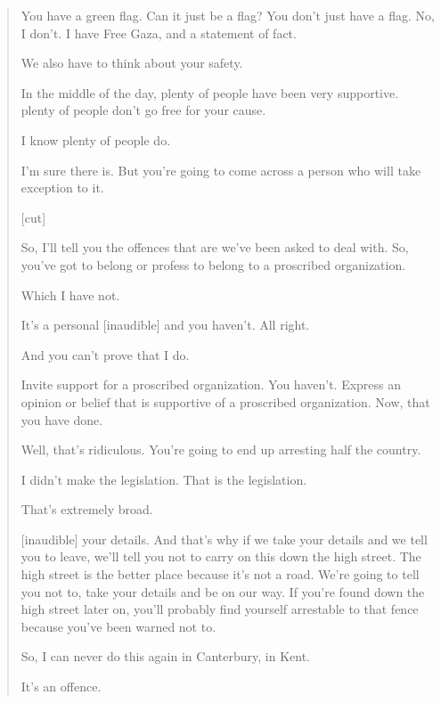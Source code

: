 \begin{quote}
    You have a green flag. Can it just be a flag? You don't just have a flag. No, I don't. I have Free Gaza, and a statement of fact.
    
    We also have to think about your safety.
    
    In the middle of the day, plenty of people have been very supportive. plenty of people don't go free for your cause.
    
    I know plenty of people do.
    
    I'm sure there is. But you’re going to come across a person who will take exception to it.
    
    [cut]
    
    So, I'll tell you the offences that are we've been asked to deal with. So, you've got to belong or profess to belong to a proscribed organization.
    
    Which I have not.
    
    It's a personal [inaudible] and you haven't. All right.
    
    And you can't prove that I do.
    
    Invite support for a proscribed organization. You haven't. Express an opinion or belief that is supportive of a proscribed organization. Now, that you have done.
    
    Well, that's ridiculous. You're going to end up arresting half the country.
    
    I didn't make the legislation. That is the legislation.
    
    That’s extremely broad.
    
    [inaudible] your details. And that's why if we take your details and we tell you to leave, we'll tell you not to carry on this down the high street. The high street is the better place because it's not a road. We're going to tell you not to, take your details and be on our way. If you're found down the high street later on, you'll probably find yourself arrestable to that fence because you've been warned not to.
    
    So, I can never do this again in Canterbury, in Kent.
    
    It’s an offence.
\end{quote}

